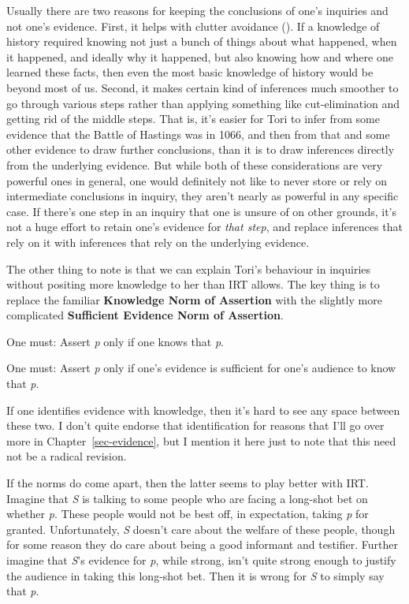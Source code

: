 \documentclass[
  10pt,
  letterpaper,
  twoside]{scrbook}
\providecommand{\tightlist}{%
  \setlength{\itemsep}{0pt}\setlength{\parskip}{0pt}}\usepackage{longtable,booktabs,array}
\begin{document}
Usually there are two reasons for keeping the conclusions of one's
inquiries and not one's evidence. First, it helps with clutter avoidance
(). If a knowledge of history
required knowing not just a bunch of things about what happened, when it
happened, and ideally why it happened, but also knowing how and where
one learned these facts, then even the most basic knowledge of history
would be beyond most of us. Second, it makes certain kind of inferences
much smoother to go through various steps rather than applying something
like cut-elimination and getting rid of the middle steps. That is, it's
easier for Tori to infer from some evidence that the Battle of Hastings
was in 1066, and then from that and some other evidence to draw further
conclusions, than it is to draw inferences directly from the underlying
evidence. But while both of these considerations are very powerful ones
in general, one would definitely not like to never store or rely on
intermediate conclusions in inquiry, they aren't nearly as powerful in
any specific case. If there's one step in an inquiry that one is unsure
of on other grounds, it's not a huge effort to retain one's evidence for
\emph{that step}, and replace inferences that rely on it with inferences
that rely on the underlying evidence.

The other thing to note is that we can explain Tori's behaviour in
inquiries without positing more knowledge to her than IRT allows. The
key thing is to replace the familiar \textbf{Knowledge Norm of
Assertion} with the slightly more complicated \textbf{Sufficient
Evidence Norm of Assertion}.

\begin{description}
\tightlist
\item[Knowledge Norm of Assertion]
One must: Assert \emph{p} only if one knows that \emph{p}.
\item[Sufficient Evidence Norm of Assertion]
One must: Assert \emph{p} only if one's evidence is sufficient for one's
audience to know that \emph{p}.
\end{description}

If one identifies evidence with knowledge, then it's hard to see any
space between these two. I don't quite endorse that identification for
reasons that I'll go over more in Chapter~\ref{sec-evidence}, but I
mention it here just to note that this need not be a radical revision.

If the norms do come apart, then the latter seems to play better with
IRT. Imagine that \emph{S} is talking to some people who are facing a
long-shot bet on whether \emph{p}. These people would not be best off,
in expectation, taking \emph{p} for granted. Unfortunately, \emph{S}
doesn't care about the welfare of these people, though for some reason
they do care about being a good informant and testifier. Further imagine
that \emph{S}'s evidence for \emph{p}, while strong, isn't quite strong
enough to justify the audience in taking this long-shot bet. Then it is
wrong for \emph{S} to simply say that \emph{p}.
\end{document}
